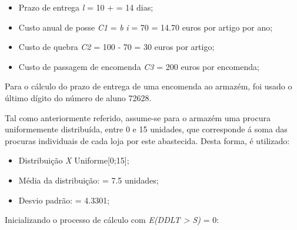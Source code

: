 \begin{itemize}
	\item Prazo de entrega \emph{l} = 10 +  = 14  dias;
	\item Custo anual de posse \emph{C1} = \emph{b} \times \emph{i} = 70  = 14.70 euros por artigo por ano;
	\item Custo de quebra \emph{C2} = 100 - 70 = 30 euros por artigo;
	\item Custo de passagem de encomenda \emph{C3} = 200 euros por encomenda;
\end{itemize}

Para o cálculo do prazo de entrega de uma encomenda ao armazém, foi usado o último dígito do número de aluno 72628.

Tal como anteriormente referido, assume-se para o armazém uma procura uniformemente distribuída, entre 0 e 15 unidades, que corresponde á soma das procuras individuais de cada loja por este abastecida. Desta forma, é utilizado:

\begin{itemize}
	\item Distribuição \emph{X} \approx Uniforme[0;15];
	\item Média da distribuição:  = 7.5 unidades;
	\item Desvio padrão:  = 4.3301;
\end{itemize}

Inicializando o processo de cálculo com \emph{E(DDLT > S)} = 0:

